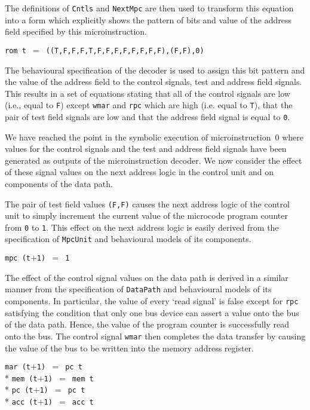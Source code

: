 \begin{normalsize}
The definitions of \verb"Cntls"
and \verb"NextMpc" are then used to transform this equation
into a form which explicitly shows the
pattern of bits and value of the address
field specified by this microinstruction.

\hspace*{\fill}
\verb"rom t "$=$\verb" ((T,F,F,F,T,F,F,F,F,F,F,F,F),(F,F),0)"
\hspace*{\fill}

The behavioural specification of the decoder is used to assign
this bit pattern and the value of the address field to the
control signals, test and address field signals.
This results in a set of equations stating that all
of the control signals are low (i.e., equal to \verb"F")
except \verb"wmar" and \verb"rpc" which are high (i.e. equal to \verb"T"),
that the pair of test field signals are low
and that the address field signal is equal to \verb"0".

We have reached the point in the symbolic execution of \mbox{microinstruction 0}
where values for the control signals
and the test and address field signals have been generated as outputs
of the microinstruction decoder.
We now consider the effect of these signal values
on the next address logic in the control unit and on components
of the data path.

The pair of test field values \verb"(F,F)" causes the next address logic
of the control unit to simply increment the current value of the
microcode program counter from \verb"0" to \verb"1".
This effect on the next address logic is easily derived from the
specification of \verb"MpcUnit" and behavioural models of its components.

\hspace*{\fill}
\verb"mpc (t"$+$\verb"1) "$=$\verb" 1"
\hspace*{\fill}

The effect of the control signal values
on the data path is derived in a similar manner from the specification
of \verb"DataPath" and behavioural models of its components.
In particular, the value of every `read signal' is false except for \verb"rpc"
satisfying the condition that only one bus device can assert a value
onto the bus of the data path.
Hence, the value of the program counter is successfully read onto
the bus.  The control signal \verb"wmar"
then completes the data transfer by
causing the value of the bus to be written into the memory address register.

\hspace*{\fill}
\begin{minipage}{45mm}
\verb"mar (t"$+$\verb"1) "$=$\verb" pc t"\\*
\verb"mem (t"$+$\verb"1) "$=$\verb" mem t"\\*
\verb"pc (t"$+$\verb"1) "$=$\verb" pc t"\\*
\verb"acc (t"$+$\verb"1) "$=$\verb" acc t"
\end{minipage}
\hspace*{\fill}


\end{normalsize}
